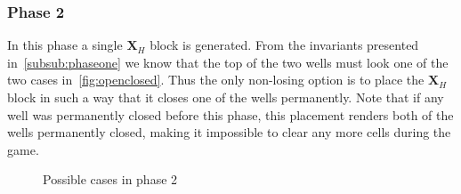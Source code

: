 \subsubsection{Phase 2}
In this phase a single $\mathbf{X}_H$ block is generated. From the invariants presented in~\ref{subsub:phaseone} we know that the top of the two wells must look one of the two cases in~\autoref{fig:openclosed}. Thus the only non-losing option is to place the $\mathbf{X}_H$ block in such a way that it closes one of the wells permanently. Note that if any well was permanently closed before this phase, this placement renders both of the wells permanently closed, making it impossible to clear any more cells during the game.

\begin{figure}[H]
    \centering
    \begin{subfigure}[b]{0.35\textwidth}
        \caption{}
    \end{subfigure}
    \hspace{0.05\textwidth}
    \begin{subfigure}[b]{0.35\textwidth}
        \caption{}
    \end{subfigure}

    \begin{subfigure}[b]{0.35\textwidth}
        \caption{}
    \end{subfigure}

    \caption{Possible cases in phase 2}
    \label{fig:placement}
\end{figure}
